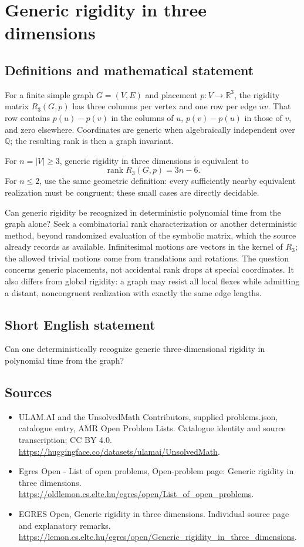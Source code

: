 \documentclass[11pt,a4paper]{article}
\begin{document}
\section*{Generic rigidity in three dimensions}\label{statement}

\subsection{Definitions and mathematical statement}
For a finite simple graph $G=(V,E)$ and placement $p:V\to\mathbb R^3$,
the rigidity matrix $R_3(G,p)$ has three columns per vertex and one row
per edge $uv$. That row contains $p(u)-p(v)$ in the columns of $u$,
$p(v)-p(u)$ in those of $v$, and zero elsewhere. Coordinates are generic
when algebraically independent over $\mathbb Q$; the resulting rank is
then a graph invariant.

For $n=|V|\ge3$, generic rigidity in three dimensions is equivalent to
\[
                           \operatorname{rank}R_3(G,p)=3n-6.
\]
For $n\le2$, use the same geometric definition: every sufficiently
nearby equivalent realization must be congruent; these small cases
are directly decidable.

Can generic rigidity be recognized in deterministic polynomial time
from the graph alone? Seek a combinatorial rank characterization or
another deterministic method, beyond randomized evaluation of the
symbolic matrix, which the source already records as available.
Infinitesimal motions are vectors in the kernel of $R_3$; the allowed
trivial motions come from translations and rotations. The question
concerns generic placements, not accidental rank drops at special
coordinates. It also differs from global rigidity: a graph may resist
all local flexes while admitting a distant, noncongruent realization
with exactly the same edge lengths.
\subsection{Short English statement}
Can one deterministically recognize generic three-dimensional
rigidity in polynomial time from the graph?
\subsection{Sources}
\begin{itemize}
\item[S1] ULAM.AI and the UnsolvedMath Contributors, supplied problems.json, catalogue entry, AMR Open Problem Lists. Catalogue identity and source transcription; CC BY 4.0.
\url{https://huggingface.co/datasets/ulamai/UnsolvedMath}.
\item[S2] Egres Open - List of open problems, Open-problem page: Generic rigidity in three dimensions. 
\url{https://oldlemon.cs.elte.hu/egres/open/List_of_open_problems}.
\item[S3] EGRES Open, Generic rigidity in three dimensions. Individual source page and explanatory remarks.
\url{https://lemon.cs.elte.hu/egres/open/Generic_rigidity_in_three_dimensions}.
\end{itemize}
\end{document}
